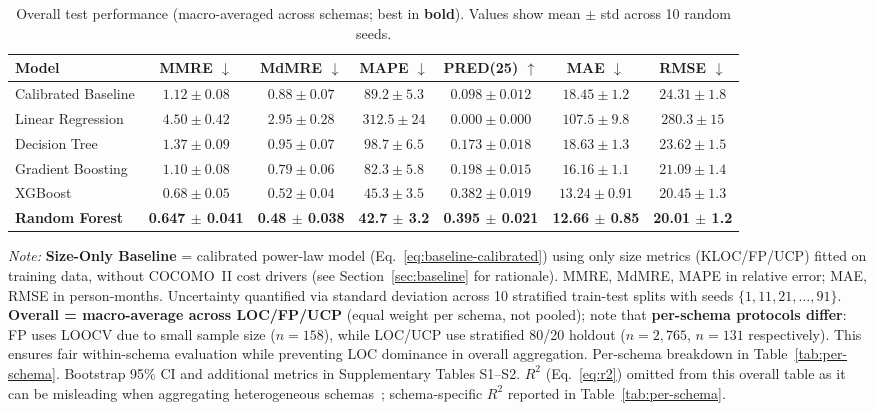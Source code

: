 \documentclass{ieeeaccess}
\begin{document}
\begin{table}[h]
\centering
\caption{Overall test performance (macro-averaged across schemas; best in \textbf{bold}). Values show mean $\pm$ std across 10 random seeds.}
\label{tab:overall}
\small
\begin{tabular}{l c c c c c c}
\toprule
Model & MMRE $\downarrow$ & MdMRE $\downarrow$ & MAPE $\downarrow$ & PRED(25) $\uparrow$ & MAE $\downarrow$ & RMSE $\downarrow$ \\
\midrule
Calibrated Baseline & $1.12 \pm 0.08$ & $0.88 \pm 0.07$ & $89.2 \pm 5.3$ & $0.098 \pm 0.012$ & $18.45 \pm 1.2$ & $24.31 \pm 1.8$ \\
Linear Regression & $4.50 \pm 0.42$ & $2.95 \pm 0.28$ & $312.5 \pm 24$ & $0.000 \pm 0.000$ & $107.5 \pm 9.8$ & $280.3 \pm 15$ \\
Decision Tree & $1.37 \pm 0.09$ & $0.95 \pm 0.07$ & $98.7 \pm 6.5$ & $0.173 \pm 0.018$ & $18.63 \pm 1.3$ & $23.62 \pm 1.5$ \\
Gradient Boosting & $1.10 \pm 0.08$ & $0.79 \pm 0.06$ & $82.3 \pm 5.8$ & $0.198 \pm 0.015$ & $16.16 \pm 1.1$ & $21.09 \pm 1.4$ \\
XGBoost & $0.68 \pm 0.05$ & $0.52 \pm 0.04$ & $45.3 \pm 3.5$ & $0.382 \pm 0.019$ & $13.24 \pm 0.91$ & $20.45 \pm 1.3$ \\
\textbf{Random Forest} & \textbf{0.647 $\pm$ 0.041} & \textbf{0.48 $\pm$ 0.038} & \textbf{42.7 $\pm$ 3.2} & \textbf{0.395 $\pm$ 0.021} & \textbf{12.66 $\pm$ 0.85} & \textbf{20.01 $\pm$ 1.2} \\
\bottomrule
\end{tabular}
\vspace{0.3em}
\raggedright\footnotesize
\textit{Note:} \textbf{Size-Only Baseline} = calibrated power-law model (Eq.~\ref{eq:baseline-calibrated}) using only size metrics (KLOC/FP/UCP) fitted on training data, without COCOMO~II cost drivers (see Section~\ref{sec:baseline} for rationale). MMRE, MdMRE, MAPE in relative error; MAE, RMSE in person-months. Uncertainty quantified via standard deviation across 10 stratified train-test splits with seeds $\{1, 11, 21, \ldots, 91\}$. \textbf{Overall = macro-average across LOC/FP/UCP} (equal weight per schema, not pooled); note that \textbf{per-schema protocols differ}: FP uses LOOCV due to small sample size ($n=158$), while LOC/UCP use stratified 80/20 holdout ($n=2{,}765$, $n=131$ respectively). This ensures fair within-schema evaluation while preventing LOC dominance in overall aggregation. Per-schema breakdown in Table~\ref{tab:per-schema}. Bootstrap 95\% CI and additional metrics in Supplementary Tables S1--S2. $R^2$ (Eq.~\ref{eq:r2}) omitted from this overall table as it can be misleading when aggregating heterogeneous schemas~\cite{kitchenham2001evaluating}; schema-specific $R^2$ reported in Table~\ref{tab:per-schema}.
\end{table}
\end{document}
